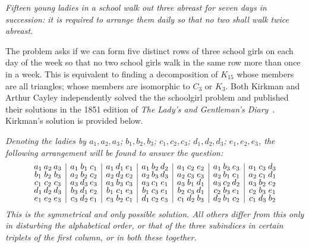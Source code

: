 \begin{center}
\begin{minipage}{0.7\textwidth}
  \centering\itshape
  Fifteen young ladies in a school walk out three abreast for seven days in succession: it is required to arrange them daily so that no two shall walk twice abreast.
\end{minipage}
\end{center}

The problem asks if we can form five distinct rows of three school girls on each day of the week so that no two school girls walk in the same row more than once in a week. This is equivalent to finding a decomposition of $K_{15}$ whose members are all triangles; whose members are isomorphic to $C_{3}$ or $K_{3}$. Both Kirkman and Arthur Cayley independently solved the the schoolgirl problem and published their solutions in the 1851 edition of \textit{The Lady's and Gentleman's Diary}~\cite{bib:Kirkman1851}. Kirkman's solution is provided below.

  \vspace{1em}
  \itshape
  \noindent Denoting the ladies by $a_1, a_2, a_3$; $b_1, b_2, b_3$; $c_1, c_2, c_3$; $d_1, d_2, d_3$; $e_1, e_2, e_3$, the following arrangement will be found to answer the question:
\[
\renewcommand{\arraystretch}{0.7}
\begin{array}{
  @{}c@{\hskip 2pt}c@{\hskip 2pt}c
  |c@{\hskip 2pt}c@{\hskip 2pt}c
  |c@{\hskip 2pt}c@{\hskip 2pt}c
  |c@{\hskip 2pt}c@{\hskip 2pt}c
  |c@{\hskip 2pt}c@{\hskip 2pt}c
  |c@{\hskip 2pt}c@{\hskip 2pt}c
  |c@{\hskip 2pt}c@{\hskip 2pt}c@{}}
a_1 & a_2 & a_3 & a_1 & b_1 & c_1 & a_1 & d_1 & e_1 & a_1 & b_2 & d_2 & a_1 & c_2 & e_2 & a_1 & b_3 & e_3 & a_1 & c_3 & d_3 \\
b_1 & b_2 & b_3 & a_2 & b_2 & c_2 & a_2 & d_2 & e_2 & a_2 & b_3 & d_3 & a_2 & c_3 & e_3 & a_2 & b_1 & e_1 & a_2 & c_1 & d_1 \\
c_1 & c_2 & c_3 & a_3 & d_3 & e_3 & a_3 & b_3 & c_3 & a_3 & c_1 & e_1 & a_3 & b_1 & d_1 & a_3 & c_2 & d_2 & a_3 & b_2 & e_2 \\
d_1 & d_2 & d_3 & b_3 & d_1 & e_2 & b_1 & c_1 & e_3 & b_1 & c_3 & e_1 & b_2 & c_3 & d_1 & c_2 & b_3 & e_1 & c_2 & b_3 & e_1 \\
e_1 & e_2 & e_3 & c_3 & d_2 & e_1 & e_3 & b_2 & c_1 & d_1 & c_2 & e_3 & c_1 & d_2 & b_3 & d_2 & b_1 & c_2 & c_1 & d_3 & b_2 \\
\end{array}
\]
\noindent This is the symmetrical and only possible solution. All others differ from this only in disturbing the alphabetical order, or that of the three subindices in certain triplets of the first column, or in both these together.\newline

